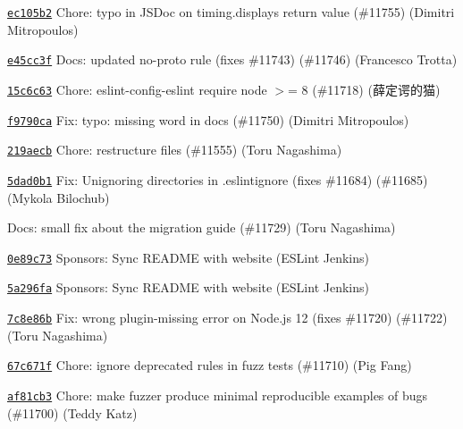 \begin{DoxyItemize}
\item \href{https://github.com/eslint/eslint/commit/ec105b24f7e036ecdc4267f018529ac3765e29d5}{\texttt{ {\ttfamily ec105b2}}} Chore\+: typo in JSDoc on timing.\+display\textquotesingle{}s return value (\#11755) (Dimitri Mitropoulos)
\item \href{https://github.com/eslint/eslint/commit/e45cc3f3dc44f3a5b6b713a1bf5ce6e46d87ca49}{\texttt{ {\ttfamily e45cc3f}}} Docs\+: updated no-\/proto rule (fixes \#11743) (\#11746) (Francesco Trotta)
\item \href{https://github.com/eslint/eslint/commit/15c6c6374c0425d5402142d012a541fa208bc9da}{\texttt{ {\ttfamily 15c6c63}}} Chore\+: eslint-\/config-\/eslint require node \texorpdfstring{$>$}{>}= 8 (\#11718) (薛定谔的猫)
\item \href{https://github.com/eslint/eslint/commit/f9790ca1baec1275f3c946586766a5713258ac32}{\texttt{ {\ttfamily f9790ca}}} Fix\+: typo\+: missing word in docs (\#11750) (Dimitri Mitropoulos)
\item \href{https://github.com/eslint/eslint/commit/219aecb78bc646d44bad27dc775a9b3d3dc58232}{\texttt{ {\ttfamily 219aecb}}} Chore\+: restructure files (\#11555) (Toru Nagashima)
\item \href{https://github.com/eslint/eslint/commit/5dad0b1d80c9cf380c49f46266c35d461d3cecad}{\texttt{ {\ttfamily 5dad0b1}}} Fix\+: Unignoring directories in .eslintignore (fixes \#11684) (\#11685) (Mykola Bilochub)
\item \href{https://github.com/eslint/eslint/commit/462509058e46770cf70307cf8dba279f0e73b967}{\texttt{ {}}} Docs\+: small fix about the migration guide (\#11729) (Toru Nagashima)
\item \href{https://github.com/eslint/eslint/commit/0e89c73177398eaf978a50d5b0f79ff8e43512f2}{\texttt{ {\ttfamily 0e89c73}}} Sponsors\+: Sync README with website (ESLint Jenkins)
\item \href{https://github.com/eslint/eslint/commit/5a296fa0c9345ad1a55e2b257e5f6c9f05fff362}{\texttt{ {\ttfamily 5a296fa}}} Sponsors\+: Sync README with website (ESLint Jenkins)
\item \href{https://github.com/eslint/eslint/commit/7c8e86bf2c900cec7cd1dfd529a8c77cc81ef34c}{\texttt{ {\ttfamily 7c8e86b}}} Fix\+: wrong \textquotesingle{}plugin-\/missing\textquotesingle{} error on Node.\+js 12 (fixes \#11720) (\#11722) (Toru Nagashima)
\item \href{https://github.com/eslint/eslint/commit/67c671fdc1c8b08cb8d263a9bb2151e3108c88b4}{\texttt{ {\ttfamily 67c671f}}} Chore\+: ignore deprecated rules in fuzz tests (\#11710) (Pig Fang)
\item \href{https://github.com/eslint/eslint/commit/af81cb3ecc5e6bf43a6a2d8f326103350513a1b8}{\texttt{ {\ttfamily af81cb3}}} Chore\+: make fuzzer produce minimal reproducible examples of bugs (\#11700) (Teddy Katz)
\end{DoxyItemize}

